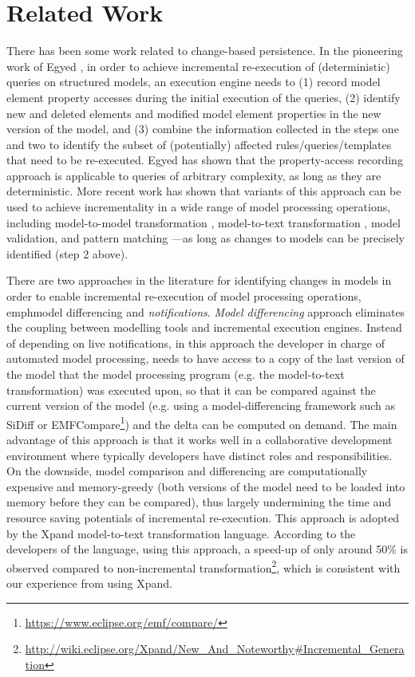 \documentclass{llncs}
\begin{document}
\section{Related Work}
\label{sec:related_work}
There has been some work related to change-based persistence. In the pioneering work of Egyed \cite{egyed2011automatically}, in order to achieve incremental re-execution of (deterministic) queries on structured models, an execution engine needs to (1) record model element property accesses during the initial execution of the queries, (2) identify new and deleted elements and modified model element properties in the new version of the model, and (3) combine the information collected in the steps one and two to identify the subset of (potentially) affected rules/queries/templates that need to be re-executed. Egyed has shown that the property-access recording approach is applicable to queries of arbitrary complexity, as long as they are deterministic. More recent work has shown that variants of this approach can be used to achieve incrementality in a wide range of model processing operations, including model-to-model transformation \cite{jouault2010towards}, model-to-text transformation \cite{ogunyomi2015property}, model validation, and pattern matching \cite{rath2012derived}---as long as changes to models can be precisely identified (step 2 above).

There are two approaches in the literature for identifying changes in models in order to enable incremental re-execution of model processing operations, emph{model differencing} and \emph{notifications}. \emph{Model differencing} approach eliminates the coupling between modelling tools and incremental execution engines. Instead of depending on live notifications, in this approach the developer in charge of automated model processing, needs to have access to a copy of the last version of the model that the model processing program (e.g. the model-to-text transformation) was executed upon, so that it can be compared against the current version of the model (e.g. using a model-differencing framework such as SiDiff \cite{kelter2005generic} or EMFCompare\footnote{\url{https://www.eclipse.org/emf/compare/}}) and the delta can be computed on demand. The main advantage of this approach is that it works well in a collaborative development environment where typically developers have distinct roles and responsibilities. On the downside, model comparison and differencing are computationally expensive and memory-greedy (both versions of the model need to be loaded into memory before they can be compared), thus largely undermining the time and resource saving potentials of incremental re-execution. This approach is adopted by the Xpand model-to-text transformation language. According to the developers of the language, using this approach, a speed-up of only around 50\% is observed compared to non-incremental transformation\footnote{\url{http://wiki.eclipse.org/Xpand/New_And_Noteworthy\#Incremental_Generation}}, which is consistent with our experience from using Xpand.
\end{document}
